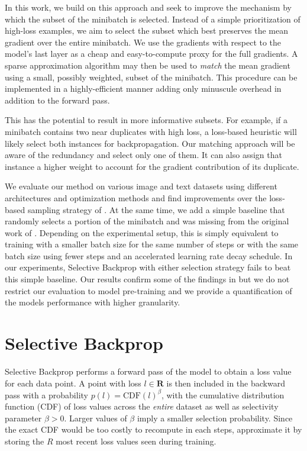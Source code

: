 \documentclass{article}
\newcommand{\R}{\mathbf{R}}
\theoremstyle{plain}
\theoremstyle{definition}
\theoremstyle{remark}
\begin{document}
In this work, we build on this approach and seek to improve the mechanism by which the subset of the minibatch is selected.
Instead of a simple prioritization of high-loss examples, we aim to select the subset which best preserves the mean gradient over the entire minibatch.
We use the gradients with respect to the model's last layer as a cheap and easy-to-compute proxy for the full gradients.
A sparse approximation algorithm may then be used to \emph{match} the mean gradient using a small, possibly weighted, subset of the minibatch.
This procedure can be implemented in a highly-efficient manner adding only minuscule overhead in addition to the forward pass.

This has the potential to result in more informative subsets.
For example, if a minibatch contains two near duplicates with high loss, a loss-based heuristic will likely select both instances for backpropagation.
Our matching approach will be aware of the redundancy and select only one of them.
It can also assign that instance a higher weight to account for the gradient contribution of its duplicate.

We evaluate our method on various image and text datasets using different architectures and optimization methods and find improvements over the loss-based sampling strategy of \citet{jiang2019accelerating}.
At the same time, we add a simple baseline that randomly selects a portion of the minibatch and was missing from the original work of \citet{jiang2019accelerating}.
Depending on the experimental setup, this is simply equivalent to training with a smaller batch size for the same number of steps or with the same batch size using fewer steps and an accelerated learning rate decay schedule.
In our experiments, Selective Backprop with either selection strategy fails to beat this simple baseline.
Our results confirm some of the findings in \citet{kaddour2023train} but we do not restrict our evaluation to model pre-training and we provide a quantification of the models performance with higher granularity.







\section{Selective Backprop}

Selective Backprop performs a forward pass of the model to obtain a loss value for each data point.
A point with loss $l\in \R$ is then included in the backward pass with a probability $p(l) = \text{CDF}(l)^\beta$, with the cumulative distribution function (CDF) of loss values across the \emph{entire} dataset as well as selectivity parameter $\beta>0$.
Larger values of $\beta$ imply a smaller selection probability.
Since the exact CDF would be too costly to recompute in each steps, \citet{jiang2019accelerating} approximate it by storing the $R$ most recent loss values seen during training.
\end{document}

